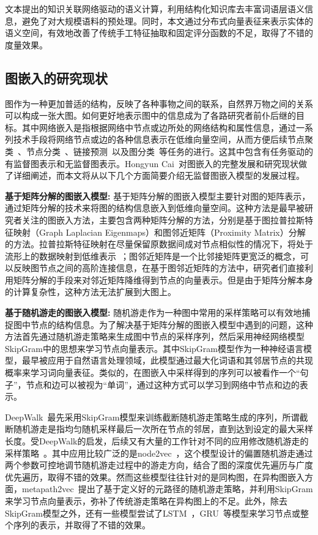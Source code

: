 文本提出的知识关联网络驱动的语义计算，利用结构化知识库去丰富词语层语义信息，避免了对大规模语料的预处理。同时，本文通过分布式向量表征来表示实体的语义空间，有效地改善了传统手工特征抽取和固定评分函数的不足，取得了不错的度量效果。

\subsection{图嵌入的研究现状}
图作为一种更加普适的结构，反映了各种事物之间的联系，自然界万物之间的关系可以构成一张大图。如何更好地表示图中的信息成为了各路研究者前仆后继的目标。其中网络嵌入是指根据网络中节点或边所处的网络结构和属性信息，通过一系列技术手段将网络节点或边的各种信息表示在低维向量空间，从而方便后续节点聚类~\cite{aaai/NieZL17}、节点分类~\cite{aaai/WangCWP0Y17}、链接预测~\cite{www/WeiXCY17}以及图分类~\cite{nips/DefferrardBV16}等任务的进行。这其中包含有任务驱动的有监督图表示和无监督图表示。Hongyun Cai~\cite{tkde/CaiZC18}对图嵌入的完整发展和研究现状做了详细阐述，而本文将从以下几个方面简要介绍无监督图嵌入模型的发展过程。

\textbf{基于矩阵分解的图嵌入模型:}
基于矩阵分解的图嵌入模型主要针对图的矩阵表示，通过矩阵分解的技术来将图的结构信息嵌入到低维向量空间。这种方法是最早被研究者关注的图嵌入方法，主要包含两种矩阵分解的方法，分别是基于图拉普拉斯特征映射（Graph Laplacian Eigenmaps）和图邻近矩阵（Proximity Matrix）分解的方法。拉普拉斯特征映射在尽量保留原数据间成对节点相似性的情况下，将处于流形上的数据映射到低维表示~\cite{nips/HofmannB94, nips/HeN03, mm/CaiHH07}；图邻近矩阵是一个比邻接矩阵更宽泛的概念，可以反映图节点之间的高阶连接信息，在基于图邻近矩阵的方法中，研究者们直接利用矩阵分解的手段来对邻近矩阵降维得到节点的向量表示\cite{NM/Golub70, nips/HofmannB94}。但是由于矩阵分解本身的计算复杂性，这种方法无法扩展到大图上。

\textbf{基于随机游走的图嵌入模型:}
随机游走作为一种图中常用的采样策略可以有效地捕捉图中节点的结构信息。为了解决基于矩阵分解的图嵌入模型中遇到的问题，这种方法首先通过随机游走策略来生成图中节点的采样序列，然后采用神经网络模型SkipGram\cite{corr/Mikolov13}中的思想来学习节点向量表示。其中SkipGram模型作为一种神经语言模型，最早被应用于自然语言处理领域，此模型通过最大化词语和其邻居节点的共现概率来学习词向量表征。类似的，在图嵌入中采样得到的序列可以被看作一个“句子”，节点和边可以被视为“单词”，通过这种方式可以学习到网络中节点和边的表示。

DeepWalk~\cite{kdd/Perozzi14}最先采用SkipGram模型来训练截断随机游走策略生成的序列，所谓截断随机游走是指均匀随机采样最后一次所在节点的邻居，直到达到设定的最大采样长度。受DeepWalk的启发，后续又有大量的工作针对不同的应用修改随机游走的采样策略~\cite{ijcnn/JinLLZZW16, kdd/GroverL16, icml/YangCS16}。其中应用比较广泛的是node2vec~\cite{kdd/GroverL16}，这个模型设计的偏置随机游走通过两个参数可控地调节随机游走过程中的游走方向，结合了图的深度优先遍历与广度优先遍历，取得不错的效果。然而这些模型往往针对的是同构图，在异构图嵌入方面，metapath2vec~\cite{kdd/DongCS17}提出了基于定义好的元路径的随机游走策略，并利用SkipGram来学习节点向量表示，弥补了传统游走策略在异构图上的不足。此外，除去SkipGram模型之外，还有一些模型尝试了LSTM~\cite{neco/HochreiterS97}，GRU~\cite{ssst/ChoMBB14}等模型来学习节点或整个序列的表示\cite{aaai/LiuZZZCWY17, www/LiMGM17}，并取得了不错的效果。

